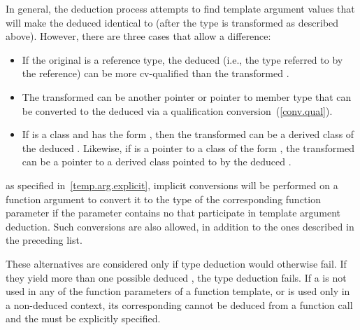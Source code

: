 \pnum
In general, the deduction process attempts to find template argument
values that will make the deduced
identical to
(after
the type
is transformed as described above).
However, there are
three cases that allow a difference:

\begin{itemize}
\item
If the original
is a reference type, the deduced
(i.e.,
the type referred to by the reference) can be more cv-qualified than
the transformed .
\item
The transformed 
can be another pointer or pointer to member type that can be converted
to the deduced
via a qualification conversion~(\ref{conv.qual}).

\item
If
is a class and
has the form
,
then
the transformed 
can be a derived class of the
deduced
.
Likewise, if
is a pointer to a class of the form
,
the transformed 
can be a pointer to a
derived class pointed to by the deduced
.
\end{itemize}

\enternote as specified in~\ref{temp.arg.explicit}, implicit conversions will be
performed on a function argument to convert it to the type of the corresponding
function parameter if the parameter contains no 
that participate in template argument deduction. Such conversions are also
allowed, in addition to the ones described in the preceding list. \exitnote

\pnum
These alternatives are considered only if type deduction would
otherwise fail.
If they yield more than one possible deduced
,
the type deduction fails.
\enternote
If a
is not used in any of the function parameters of a function template,
or is used only in a non-deduced context, its corresponding
cannot be deduced from a function call and the
must be explicitly specified.
\exitnote

